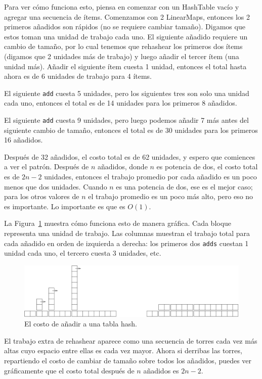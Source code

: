 \documentclass[10pt]{book}
\begin{document}
Para ver cómo funciona esto, piensa en comenzar con un
HashTable vacío y agregar una secuencia de ítems.  Comenzamos con 2 LinearMaps,
entonces los 2 primeros añadidos son rápidos (no se requiere cambiar tamaño).  Digamos
que estos toman una unidad de trabajo cada uno.  El siguiente añadido
requiere un cambio de tamaño, por lo cual tenemos que rehashear los primeros dos
ítems (digamos que 2 unidades más de trabajo) y luego
añadir el tercer ítem (una unidad más).  Añadir el siguiente ítem
cuesta 1 unidad, entonces el total hasta ahora es
de 6 unidades de trabajo para 4 ítems.

El siguiente {\tt add} cuesta 5 unidades, pero los siguientes tres
son solo una unidad cada uno, entonces el total es de 14 unidades para los
primeros 8 añadidos.

El siguiente {\tt add} cuesta 9 unidades, pero luego podemos añadir 7 más
antes del siguiente cambio de tamaño, entonces el total es de 30 unidades para los
primeros 16 añadidos.

Después de 32 añadidos, el costo total es de 62 unidades, y espero que comiences
a ver el patrón.  Después de $n$ añadidos, donde $n$ es potencia de dos, el
costo total es de $2n-2$ unidades, entonces el trabajo promedio por cada añadido es
un poco menos que dos unidades.  Cuando $n$ es una potencia de dos, ese es
el mejor caso; para los otros valores de $n$  el trabajo promedio es un poco
más alto, pero eso no es importante.  Lo importante es que
es $O(1)$.

La Figura~\ref{fig.hash} muestra cómo funciona esto de manera gráfica.  Cada
bloque representa una unidad de trabajo.  Las columnas muestran el trabajo
total para cada añadido en orden de izquierda a derecha: los primeros dos
{\tt adds} cuestan 1 unidad cada uno, el tercero cuesta 3 unidades, etc.

\begin{figure}
\centerline{\includegraphics[width=5.5in]{figs/towers.pdf}}
\caption{El costo de añadir a una tabla hash.\label{fig.hash}}
\end{figure}

El trabajo extra de rehashear aparece como una secuencia de torres
cada vez más altas cuyo espacio entre ellas es cada vez mayor.  Ahora si derribas
las torres, repartiendo el costo de cambiar de tamaño sobre todos los
añadidos, puedes ver gráficamente que el costo total después de $n$
añadidos es $2n - 2$.
\end{document}
